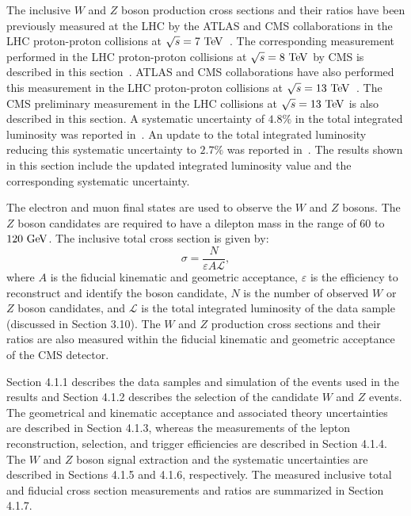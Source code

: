 The inclusive $W$ and $Z$ boson production cross sections and their ratios have been previously measured at the LHC by the ATLAS and CMS collaborations in the LHC proton-proton collisions at $\sqrt{s}=7~\mathrm{Te\kern -0.1em V}$~\cite{CMS:2011aa,Chatrchyan:2011nv,Aad:2011dm}. The corresponding measurement performed in the LHC proton-proton collisions at $\sqrt{s}=8~\mathrm{Te\kern -0.1em V}$ by CMS is described in this section~\cite{Chatrchyan:2014mua}. ATLAS and CMS collaborations have also performed this measurement in the LHC proton-proton collisions at $\sqrt{s}=13~\mathrm{Te\kern -0.1em V}$~\cite{CMS-PAS-SMP-15-004,Aad:2016naf}. The CMS preliminary measurement in the LHC collisions at $\sqrt{s}=13~\mathrm{Te\kern -0.1em V}$ is also described in this section. A systematic uncertainty of $4.8\%$ in the total integrated luminosity was reported in~\cite{CMS-PAS-SMP-15-004}. An update to the total integrated luminosity  reducing this systematic uncertainty to $2.7\%$ was reported in~\cite{CMS-PAS-LUM-15-001}. The results shown in this section include the updated integrated luminosity value and the corresponding systematic uncertainty.

The electron and muon final states are used to observe the $W$ and $Z$ bosons. The $Z$ boson candidates are required to have a dilepton mass in the range of $60$ to $120~\mathrm{Ge\kern -0.1em V}$. The inclusive total cross section is given by:  
\begin{equation} \label{eq:xsec2}
\sigma = \frac{N}{\varepsilon A \mathcal{L}},
\end{equation}
where $A$ is the fiducial kinematic and geometric acceptance, $\varepsilon$ is the efficiency to reconstruct and identify the boson candidate, $N$ is the number of observed $W$ or $Z$ boson candidates, and $\mathcal{L}$ is the total integrated luminosity of the data sample (discussed in Section 3.10).  The $W$ and $Z$ production cross sections and their ratios are also measured within the fiducial kinematic and geometric acceptance of the CMS detector.  

Section 4.1.1 describes the data samples and simulation of the events used in the results and Section 4.1.2 describes the selection of the candidate $W$ and $Z$ events. The geometrical and kinematic acceptance and associated theory uncertainties are described in Section 4.1.3, whereas the measurements of the lepton reconstruction, selection, and trigger efficiencies are described in Section 4.1.4. The $W$ and $Z$ boson signal extraction and the systematic uncertainties are described in Sections 4.1.5 and 4.1.6, respectively.  The measured inclusive total and fiducial cross section measurements and ratios are summarized in Section 4.1.7.  

